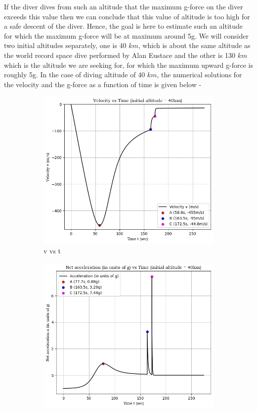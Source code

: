 \documentclass[a4paper, 14pt]{extarticle}
\begin{document}
If the diver dives from such an altitude that the maximum g-force on the diver exceeds this value then we can conclude that this value of altitude is too high for a safe descent of the diver.
Hence, the goal is here to estimate such an altitude for which the maximum g-force will be at maximum around 5g.
We will consider two initial altitudes separately, one is 40 $km$, which is about the same altitude as the world record space dive performed by Alan Eustace  and the other is 130 $km$ which is the altitude we are seeking for, for which the maximum upward g-force is roughly 5g.
In the case of diving altitude of 40 $km$, the numerical solutions for the velocity and the g-force as a function of time is given below -\\
\begin{figure}[ht]
  \begin{subfigure}{0.5\textwidth}
    \includegraphics[width=\linewidth]{40-2}
    \caption{v vs t}
  \end{subfigure}
  \hfill
  \begin{subfigure}{0.5\textwidth}
    \includegraphics[width=\linewidth]{40-3}

\end{subfigure}
\end{figure}
\end{document}
